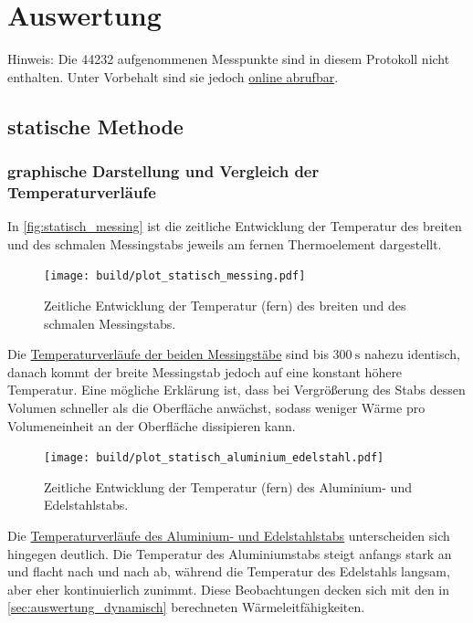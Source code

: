 \section{Auswertung} \label{sec:auswertung}

Hinweis: Die 44232 aufgenommenen Messpunkte sind in diesem Protokoll nicht enthalten.
Unter Vorbehalt sind sie jedoch \href{https://github.com/NicoWeio/AP/tree/master/V204_Waermeleitung}{online abrufbar}.

\subsection{statische Methode}

\subsubsection{graphische Darstellung und Vergleich der Temperaturverläufe}

In \autoref{fig:statisch_messing} ist die zeitliche Entwicklung der Temperatur des breiten und des schmalen Messingstabs jeweils am fernen Thermoelement dargestellt.

\begin{figure}[H]
  \centering
  \texttt{[image: build/plot\_statisch\_messing.pdf]}
  \caption{Zeitliche Entwicklung der Temperatur (fern) des breiten und des schmalen Messingstabs.}
  \label{fig:statisch_messing}
\end{figure}

Die \hyperref[fig:statisch_messing]{Temperaturverläufe der beiden Messingstäbe}
sind bis $\SI{300}{\second}$ nahezu identisch,
danach kommt der breite Messingstab jedoch auf eine konstant höhere Temperatur.
Eine mögliche Erklärung ist,
dass bei Vergrößerung des Stabs dessen Volumen schneller als die Oberfläche anwächst,
sodass weniger Wärme pro Volumeneinheit an der Oberfläche dissipieren kann.

\begin{figure}[H]
  \centering
  \texttt{[image: build/plot\_statisch\_aluminium\_edelstahl.pdf]}
  \caption{Zeitliche Entwicklung der Temperatur (fern) des Aluminium- und Edelstahlstabs.}
  \label{fig:statisch_aluminium_edelstahl}
\end{figure}

Die \hyperref[fig:statisch_messing]{Temperaturverläufe des Aluminium- und Edelstahlstabs}
unterscheiden sich hingegen deutlich.
Die Temperatur des Aluminiumstabs steigt anfangs stark an und flacht nach und nach ab,
während die Temperatur des Edelstahls langsam, aber eher kontinuierlich zunimmt.
Diese Beobachtungen decken sich mit den in \autoref{sec:auswertung_dynamisch} berechneten Wärmeleitfähigkeiten.


